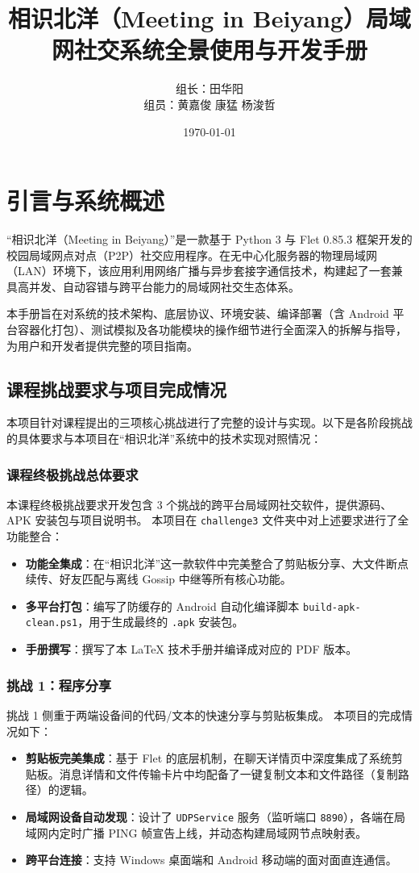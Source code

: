 \documentclass[UTF8]{ctexart}
\title{\textbf{相识北洋（Meeting in Beiyang）局域网社交系统全景使用与开发手册}}
\author{组长：田华阳 \\ 组员：黄嘉俊 \quad 康猛 \quad 杨浚哲}
\date{\today}
\begin{document}
\maketitle
\tableofcontents
\newpage

\section{引言与系统概述}
“相识北洋（Meeting in Beiyang）”是一款基于 Python 3 与 Flet 0.85.3 框架开发的校园局域网点对点（P2P）社交应用程序。在无中心化服务器的物理局域网（LAN）环境下，该应用利用网络广播与异步套接字通信技术，构建起了一套兼具高并发、自动容错与跨平台能力的局域网社交生态体系。

本手册旨在对系统的技术架构、底层协议、环境安装、编译部署（含 Android 平台容器化打包）、测试模拟及各功能模块的操作细节进行全面深入的拆解与指导，为用户和开发者提供完整的项目指南。

\subsection{课程挑战要求与项目完成情况}
本项目针对课程提出的三项核心挑战进行了完整的设计与实现。以下是各阶段挑战的具体要求与本项目在“相识北洋”系统中的技术实现对照情况：

\subsubsection{课程终极挑战总体要求}
本课程终极挑战要求开发包含 3 个挑战的跨平台局域网社交软件，提供源码、APK 安装包与项目说明书。
本项目在 \texttt{challenge3} 文件夹中对上述要求进行了全功能整合：
\begin{itemize}
    \item \textbf{功能全集成}：在“相识北洋”这一款软件中完美整合了剪贴板分享、大文件断点续传、好友匹配与离线 Gossip 中继等所有核心功能。
    \item \textbf{多平台打包}：编写了防缓存的 Android 自动化编译脚本 \texttt{build-apk-clean.ps1}，用于生成最终的 \texttt{.apk} 安装包。
    \item \textbf{手册撰写}：撰写了本 LaTeX 技术手册并编译成对应的 PDF 版本。
\end{itemize}

\subsubsection{挑战 1：程序分享}
挑战 1 侧重于两端设备间的代码/文本的快速分享与剪贴板集成。
本项目的完成情况如下：
\begin{itemize}
    \item \textbf{剪贴板完美集成}：基于 Flet 的底层机制，在聊天详情页中深度集成了系统剪贴板。消息详情和文件传输卡片中均配备了一键复制文本和文件路径（复制路径）的逻辑。
    \item \textbf{局域网设备自动发现}：设计了 \texttt{UDPService} 服务（监听端口 \texttt{8890}），各端在局域网内定时广播 PING 帧宣告上线，并动态构建局域网节点映射表。
    \item \textbf{跨平台连接}：支持 Windows 桌面端和 Android 移动端的面对面直连通信。
\end{itemize}
\end{document}
